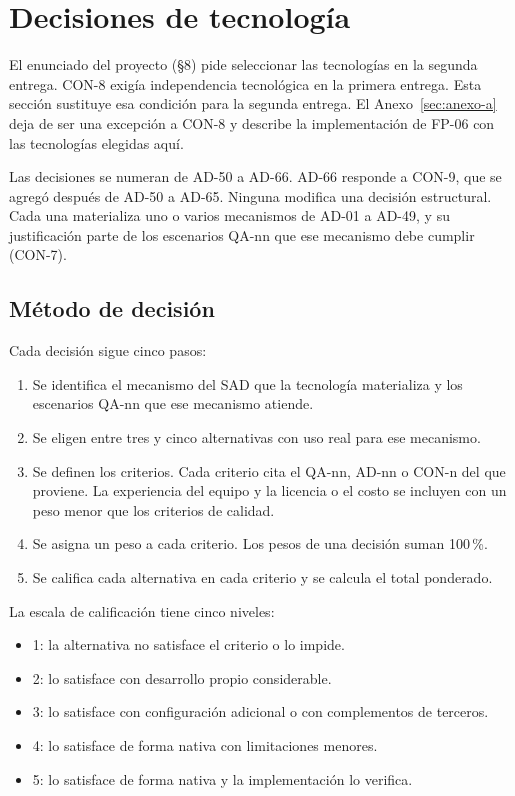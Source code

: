 \section{Decisiones de tecnología}
\label{sec:tecnologia}

El enunciado del proyecto (§8) pide seleccionar las tecnologías en la segunda entrega.
CON-8 exigía independencia tecnológica en la primera entrega.
Esta sección sustituye esa condición para la segunda entrega.
El Anexo~\ref{sec:anexo-a} deja de ser una excepción a CON-8 y describe la implementación de FP-06 con las tecnologías elegidas aquí.

Las decisiones se numeran de AD-50 a AD-66.
AD-66 responde a CON-9, que se agregó después de AD-50 a AD-65.
Ninguna modifica una decisión estructural.
Cada una materializa uno o varios mecanismos de AD-01 a AD-49, y su justificación parte de los escenarios QA-nn que ese mecanismo debe cumplir (CON-7).

\subsection{Método de decisión}
\label{sec:tec-metodo}

Cada decisión sigue cinco pasos:
\begin{enumerate}
  \item Se identifica el mecanismo del SAD que la tecnología materializa y los escenarios QA-nn que ese mecanismo atiende.
  \item Se eligen entre tres y cinco alternativas con uso real para ese mecanismo.
  \item Se definen los criterios. Cada criterio cita el QA-nn, AD-nn o CON-n del que proviene. La experiencia del equipo y la licencia o el costo se incluyen con un peso menor que los criterios de calidad.
  \item Se asigna un peso a cada criterio. Los pesos de una decisión suman 100\,\%.
  \item Se califica cada alternativa en cada criterio y se calcula el total ponderado.
\end{enumerate}

La escala de calificación tiene cinco niveles:
\begin{itemize}
  \item 1: la alternativa no satisface el criterio o lo impide.
  \item 2: lo satisface con desarrollo propio considerable.
  \item 3: lo satisface con configuración adicional o con complementos de terceros.
  \item 4: lo satisface de forma nativa con limitaciones menores.
  \item 5: lo satisface de forma nativa y la implementación lo verifica.
\end{itemize}

